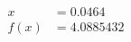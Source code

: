 \documentclass[preview]{standalone}
\begin{document}
\begin{align*}
x &= 0.0464\\f(x) &= 4.0885432
\end{align*}
\end{document}
